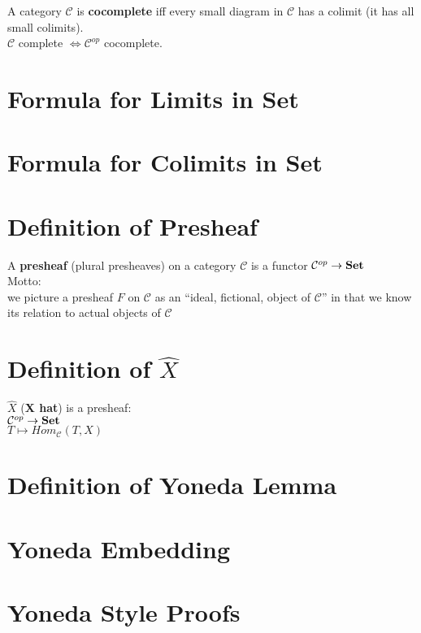 \documentclass[a4paper, twoside, english, 11pt]{book}
\newcommand{\C}{\mathcal C}
\newcommand{\catname}[1]{{\normalfont\textbf{#1}}}
\newcommand{\Set}{\catname{Set}}
\begin{document}
A category $\C$ is \textbf{cocomplete} iff every small diagram in $\C$ has a colimit (it has all small colimits). \\

$\C$ complete $\iff \C^{op}$ cocomplete.



\section{Formula for Limits in Set}
\section{Formula for Colimits in Set}



\section{Definition of Presheaf}

A \textbf{presheaf} (plural presheaves) on a category $\C$ is a functor $\C^{op} \rightarrow \Set$ \\

\noindent
Motto: \\
we picture a presheaf $F$ on $\C$ as an ``ideal, fictional, object of $\C$'' in that we know its relation to actual objects of $\C$



\section {Definition of $\hat X$}

$\hat X$ (\textbf{X hat}) is a presheaf: \\

$\C^{op} \rightarrow \Set$ \\
\indent
$T \mapsto Hom_\C(T, X)$



\section{Definition of Yoneda Lemma}
\section{Yoneda Embedding}
\section{Yoneda Style Proofs}
\end{document}
